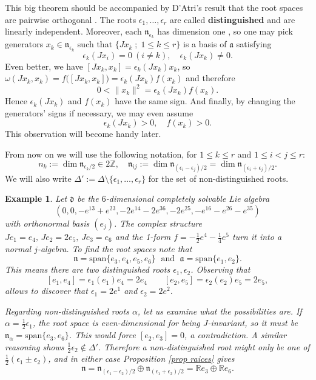 \documentclass[12pt, twoside]{amsart}
\def\d{\mathfrak{d}}
\def\n{\mathfrak{n}}
\def\a{\mathfrak{a}}
\def\R{\mathbb{R}}
\def\Z{\mathbb{Z}}
\newtheorem{example}[definition]{\bf Example}
\theoremstyle{definition}
\begin{document}
This big theorem should be accompanied by D'Atri's result that the root spaces are pairwise orthogonal \cite{D}. The roots $\epsilon_1 , \ldots,  \epsilon_r$ are called {\bf distinguished} and are linearly independent. 
Moreover, each $\n_{\epsilon_k}$ has dimension one \cite{D}, so one may pick generators $x_k \in \n_{\epsilon_k} $ such that $\{ Jx_k \; ; \; 1\leq k \leq r \}$ is a basis of $\a$ satisfying 
\begin{equation}\label{anular raices}
    \epsilon_{k}(Jx_i)=0\ (i\neq k), \quad \epsilon_{k}(Jx_k)\neq 0.
\end{equation}
Even better, 
we have $[Jx_k, x_k]=\epsilon_{k}(Jx_k)x_k$, so $\omega (Jx_k, x_k)=f\big([Jx_k, x_k]\big)=\epsilon_{k}(Jx_k)f(x_k)$ and therefore
\begin{equation} \label{base ortonormal}
    0<\| x_k \|^2 
    =\epsilon_{k}(Jx_k)f(x_k).
\end{equation}
Hence  $\epsilon_{k}(Jx_k)$ and $f(x_k)$ have the same sign. And finally, by changing the generators' signs if necessary, we may even assume 
\begin{equation}\label{f(x_k)<0}
   \epsilon_{k}(Jx_k)>0, \quad  f(x_k)>0.
\end{equation}
This observation will become handy later. 
\bigbreak

From now on we will use the following notation, for $1\leq k\leq r$ and $1\leq i<j\leq r$:
\begin{equation}\label{eq: dimensiones} 
n_{k}:=\dim \n_{\epsilon_k/2}\in 2\Z, \quad \n_{ij}:=\dim \n_{(\epsilon_{i}-\epsilon_{j})/2}=\dim \n_{(\epsilon_{i}+\epsilon_{j})/2}. 
\end{equation}
We will also write $\Delta':=\Delta\setminus \{\epsilon_1 , \dots , \epsilon_r\}$ for the set of non-distinguished roots.
\medskip

\begin{example} 
{\rm
Let $\d$ be the $6$-dimensional completely solvable Lie algebra 
$$(0, 0, -e^{13}+e^{23}, -2 e^{14}- 2 e^{36}, -2 e^{25}, -e^{16}-e^{26}-e^{35})
$$
with orthonormal basis $(e_j)$. 
The complex structure $Je_1=e_4, \, Je_2=2e_5,\, Je_3= e_6$ and the 1-form $f=-\frac12 e^4-\frac14 e^5$ turn it into a normal $j$-algebra.   
To find the root spaces note that 
$$\n=\text{span}\{e_3,e_4,e_5,e_6\} \;\text{ and }\;  \a=\text{span}\{e_1,e_2\}.$$
This means there are two distinguished roots $\epsilon_1, \epsilon_2$.  
Observing that 
$$
    [e_1,e_4]=\epsilon_{1}(e_1)e_4=2e_4\qquad 
    [e_2,e_5]=\epsilon_{2}(e_2)e_5=2e_5,
$$
allows to discover that $\epsilon_{1}=2e^{1}$ and $\epsilon_{2}=2e^{2}$.\par
\quad Regarding non-distinguished roots $\alpha$, let us examine what the possibilities are.
If $\alpha=\tfrac{1}{2}\epsilon_1$, the root space is even-dimensional for being $J$-invariant, so it must be $\n_{\alpha}=\text{span}\{e_3,e_6\}$. This would force  $[e_2,e_3]=0$, a contradiction. A similar reasoning shows $\tfrac{1}{2}\epsilon_2\notin\Delta'$. Therefore a non-distinguished root might only be one of $\tfrac{1}{2}(\epsilon_{1} \pm\epsilon_{2})$, and in either case Proposition \ref{prop raices} gives 
$$\n=\n_{(\epsilon_1-\epsilon_2)/2}\oplus \n_{(\epsilon_1+\epsilon_2)/2} =  \R e_3 \oplus \R e_6.$$}
\end{example}
\end{document}
